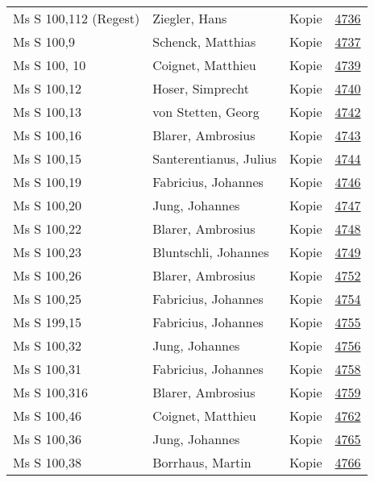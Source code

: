 \documentclass[10pt,a4paper,landscape]{report}
\begin{document}
\begin{longtable}{p{16cm}p{4cm}lr}
Ms S 100,112 (Regest)	&	Ziegler, Hans	&	Kopie	&	\href{http://130.60.24.72/assignment/4736}{4736}\\
Ms S 100,9	&	Schenck, Matthias	&	Kopie	&	\href{http://130.60.24.72/assignment/4737}{4737}\\
Ms S 100, 10	&	Coignet, Matthieu	&	Kopie	&	\href{http://130.60.24.72/assignment/4739}{4739}\\
Ms S 100,12	&	Hoser, Simprecht	&	Kopie	&	\href{http://130.60.24.72/assignment/4740}{4740}\\
Ms S 100,13	&	von Stetten, Georg	&	Kopie	&	\href{http://130.60.24.72/assignment/4742}{4742}\\
Ms S 100,16	&	Blarer, Ambrosius	&	Kopie	&	\href{http://130.60.24.72/assignment/4743}{4743}\\
Ms S 100,15	&	Santerentianus, Julius	&	Kopie	&	\href{http://130.60.24.72/assignment/4744}{4744}\\
Ms S 100,19	&	Fabricius, Johannes	&	Kopie	&	\href{http://130.60.24.72/assignment/4746}{4746}\\
Ms S 100,20	&	Jung, Johannes	&	Kopie	&	\href{http://130.60.24.72/assignment/4747}{4747}\\
Ms S 100,22	&	Blarer, Ambrosius	&	Kopie	&	\href{http://130.60.24.72/assignment/4748}{4748}\\
Ms S 100,23	&	Bluntschli, Johannes	&	Kopie	&	\href{http://130.60.24.72/assignment/4749}{4749}\\
Ms S 100,26	&	Blarer, Ambrosius	&	Kopie	&	\href{http://130.60.24.72/assignment/4752}{4752}\\
Ms S 100,25	&	Fabricius, Johannes	&	Kopie	&	\href{http://130.60.24.72/assignment/4754}{4754}\\
Ms S 199,15	&	Fabricius, Johannes	&	Kopie	&	\href{http://130.60.24.72/assignment/4755}{4755}\\
Ms S 100,32	&	Jung, Johannes	&	Kopie	&	\href{http://130.60.24.72/assignment/4756}{4756}\\
Ms S 100,31	&	Fabricius, Johannes	&	Kopie	&	\href{http://130.60.24.72/assignment/4758}{4758}\\
Ms S 100,316	&	Blarer, Ambrosius	&	Kopie	&	\href{http://130.60.24.72/assignment/4759}{4759}\\
Ms S 100,46	&	Coignet, Matthieu	&	Kopie	&	\href{http://130.60.24.72/assignment/4762}{4762}\\
Ms S 100,36	&	Jung, Johannes	&	Kopie	&	\href{http://130.60.24.72/assignment/4765}{4765}\\
Ms S 100,38	&	Borrhaus, Martin	&	Kopie	&	\href{http://130.60.24.72/assignment/4766}{4766}\\

\end{longtable}
\end{document}
